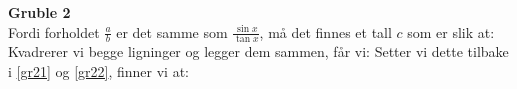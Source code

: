 \textbf{Gruble 2} \\
Fordi forholdet $ \frac{a}{b}$ er det samme som $ \frac{\sin x}{\tan x} $, må det finnes et tall $ c $ som er slik at:
Kvadrerer vi begge ligninger og legger dem sammen, får vi:
Setter vi dette tilbake i \eqref{gr21} og \eqref{gr22}, finner vi at:
